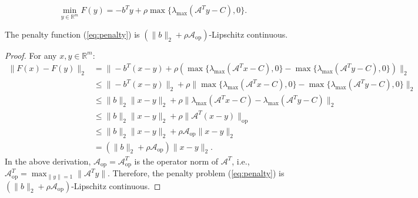 \documentclass[10pt,a4paper]{amsart}
\begin{document}
\begin{equation}\label{eq:penalty}
\underset{y\in \mathbb{R}^{m}}{\min}F(y)=-b^{T}y+\rho\max\{\lambda_{\max}(\mathcal{A}^{T}y-C),0\}.
\end{equation}

\begin{lemma}\label{lemma4.2}
The penalty function (\ref{eq:penalty}) is \((\|b\|_{2}+\rho \mathcal{A}_{\text{op}})\)-Lipschitz continuous.
\end{lemma}

\begin{proof}
    For any \(x, y \in \mathbb{R}^m\):
    \begin{equation*}
    \begin{aligned}
         \|F(x)-F(y)\|_{2}&=\|-b^{T}(x-y)+\rho(\max\{\lambda_{\max}(\mathcal{A}^{T}x-C),0\}-\max\{\lambda_{\max}(\mathcal{A}^{T}y-C),0\})\|_{2}\\
         &\leq \|-b^{T}(x-y)\|_{2}+\rho\|\max\{\lambda_{\max}(\mathcal{A}^{T}x-C),0\}-\max\{\lambda_{\max}(\mathcal{A}^{T}y-C),0\}\|_{2}\\
         &\leq \|b\|_{2}\|x-y\|_{2}+\rho\|\lambda_{\max}(\mathcal{A}^{T}x-C)-\lambda_{\max}(\mathcal{A}^{T}y-C)\|_{2}\\
         &\leq \|b\|_{2}\|x-y\|_{2}+\rho\|\mathcal{A}^{T}(x-y)\|_{\text{op}}\\
         &\leq \|b\|_{2}\|x-y\|_{2}+\rho\mathcal{A}_{\text{op}}\|x-y\|_{2}\\
         &=(\|b\|_{2}+\rho \mathcal{A}_{\text{op}})\|x-y\|_{2}.
    \end{aligned}
    \end{equation*}
    In the above derivation, \(\mathcal{A}_{\text{op}}=\mathcal{A}^{T}_{\text{op}}\) is the operator norm of \(\mathcal{A}^{T}\), i.e., \(\mathcal{A}^{T}_{\text{op}} = \max_{\|y\| = 1} \|\mathcal{A}^{T}y\|\). Therefore, the penalty problem (\ref{eq:penalty}) is \((\|b\|_2 + \rho \mathcal{A}_{\text{op}})\)-Lipschitz continuous.
    \hfill\fbox{\rule{0pt}{0.42mm}\rule{0.42mm}{0pt}}
\end{proof}
\end{document}
